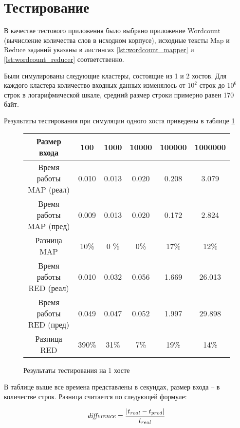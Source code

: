 \documentclass[../diploma.tex]{subfile}
\begin{document}
    \section{Тестирование}
    \label{sec:testing}

    В качестве тестового приложения было выбрано приложение Wordcount
    (вычисление количества слов в исходном корпусе), исходные тексты Map и
    Reduce заданий указаны в листингах \ref{lst:wordcount_mapper} и
    \ref{lst:wordcount_reducer} соответственно. 

    Были симулированы следующие кластеры, состоящие из 1 и 2 хостов. Для
    каждого кластера количество входных данных изменялось от $10^2$ строк до
    $10^{6}$ строк в логарифмической шкале, средний размер строки примерно равен
    170 байт.

    Результаты тестирования при симуляции одного хоста приведены в таблице \ref{table:testing_single}

    \begin{figure}[H]
    \begin{center}
    \begin{tabular}{c|c|c|c|c|c}
        Размер входа              & 100   & 1000  & 10000 & 100000 & 1000000 \\ \hline
        Время работы MAP (реал)   & 0.010 & 0.013 & 0.020 & 0.208  & 3.079   \\
        Время работы MAP (пред)   & 0.009 & 0.013 & 0.020 & 0.172  & 2.824   \\
        Разница MAP               & 10\%  & 0 \%  & 0\%   & 17\%   & 12\%    \\ \hline
        Время работы RED (реал)   & 0.010 & 0.032 & 0.056 & 1.669  & 26.013  \\
        Время работы RED (пред)   & 0.049 & 0.047 & 0.052 & 1.997  & 29.898  \\
        Разница RED               & 390\% & 31\%  & 7\%   & 19\%   & 14\%    \\
    \end{tabular}
    \medskip
    \end{center}
    \caption{Результаты тестирования на 1 хосте}
    \label{table:testing_single}
    \end{figure}

    В таблице выше все времена представлены в секундах, размер входа -- в
    количестве строк. Разница считается по следующей формуле:

    \begin{equation}
        \text{\textit{difference}} = \frac{|t_{real} - t_{pred}|}{t_{real}}
    \end{equation}
    
\end{document}
